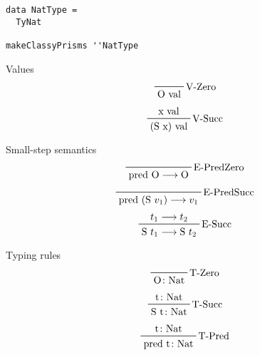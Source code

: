 \documentclass{beamer}
\begin{document}
\begin{frame}[fragile]
\begin{verbatim}
data NatType =
  TyNat

makeClassyPrisms ''NatType
\end{verbatim}
\end{frame}


\begin{frame}[c]
  Values
  \begin{displaymath}  
    \prftree[r]{V-Zero}
    {\text{O val}}
  \end{displaymath} 
  \begin{displaymath}  
    \prftree[r]{V-Succ}
    {\text{x val}}
    {\text{(S x) val}}
  \end{displaymath} 
\end{frame}


\begin{frame}[c]
  Small-step semantics
  \begin{displaymath}  
    \prftree[r]{E-PredZero}
    {\text{pred O} \longrightarrow \text{O}}
  \end{displaymath}  
  \begin{displaymath}  
    \prftree[r]{E-PredSucc}
    {\text{pred (S $v_1$)} \longrightarrow \text{$v_1$}}
  \end{displaymath}  
  \begin{displaymath}  
    \prftree[r]{E-Succ}
    {t_1 \longrightarrow t_2}
    {\text{S $t_1$} \longrightarrow \text{S $t_2$}}
  \end{displaymath}  
\end{frame}

\begin{frame}
  Typing rules
  \begin{displaymath}  
    \prftree[r]{T-Zero}
    {\text{O} \colon \text{Nat}}
  \end{displaymath}  
  \begin{displaymath}  
    \prftree[r]{T-Succ}
    {\text{t} \colon \text{Nat}}
    {\text{S t} \colon \text{Nat}}
  \end{displaymath}  
  \begin{displaymath}  
    \prftree[r]{T-Pred}
    {\text{t} \colon \text{Nat}}
    {\text{pred t} \colon \text{Nat}}
  \end{displaymath}  
\end{frame}
\end{document}
